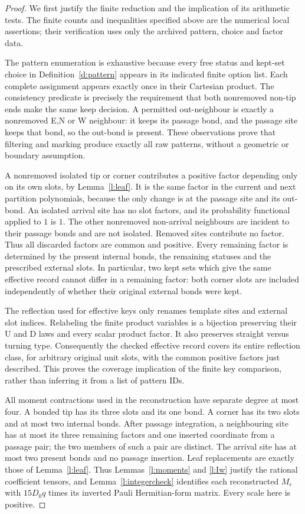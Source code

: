 \begin{proof}
We first justify the finite reduction and the implication of its
arithmetic tests. The finite counts and inequalities specified
above are the numerical local assertions; their verification uses
only the archived pattern, choice and factor data.

The pattern enumeration is exhaustive because every free status
and kept-set choice in Definition~\ref{d:pattern} appears in its
indicated finite option list. Each complete assignment appears
exactly once in their Cartesian product. The consistency predicate
is precisely the requirement that both nonremoved non-tip ends
make the same keep decision. A permitted out-neighbour is exactly
a nonremoved E,N or W neighbour: it keeps its passage bond, and
the passage site keeps that bond, so the out-bond is present.
These observations prove that filtering and marking produce
exactly all raw patterns, without a geometric or boundary assumption.

A nonremoved isolated tip or corner contributes a positive factor
depending only on its own slots, by Lemma~\ref{l:leaf}. It is
the same factor in the current and next partition polynomials,
because the only change is at the passage site and its out-bond.
An isolated arrival site has no slot factors, and its probability
functional applied to \(1\) is \(1\). The other nonremoved
non-arrival neighbours are incident to their passage bonds and
are not isolated. Removed sites contribute no factor. Thus all
discarded factors are common and positive. Every remaining factor
is determined by the present internal bonds, the remaining statuses
and the prescribed external slots. In particular, two kept sets
which give the same effective record cannot differ in a remaining
factor: both corner slots are included independently of whether
their original external bonds were kept.

The reflection used for effective keys only renames template sites
and external slot indices. Relabeling the finite product variables
is a bijection preserving their U and D laws and every scalar
product factor. It also preserves straight versus turning type.
Consequently the checked effective record covers its entire
reflection class, for arbitrary original unit slots, with the
common positive factors just described. This proves the coverage
implication of the finite key comparison, rather than inferring it
from a list of pattern IDs.

All moment contractions used in the reconstruction have separate
degree at most four. A bonded tip has its three slots and its one
bond. A corner has its two slots and at most two internal bonds.
After passage integration, a neighbouring site has at most its
three remaining factors and one inserted coordinate from a passage
pair; the two members of such a pair are distinct. The arrival
site has at most two present bonds and no passage insertion.
Leaf replacements are exactly those of Lemma~\ref{l:leaf}.
Thus Lemmas~\ref{l:moments} and \ref{l:Iw} justify the rational
coefficient tensors, and Lemma~\ref{l:integercheck} identifies each
reconstructed \(M_\epsilon\) with \(15D_0q\) times its inverted
Pauli Hermitian-form matrix. Every scale here is positive.


\end{proof}
